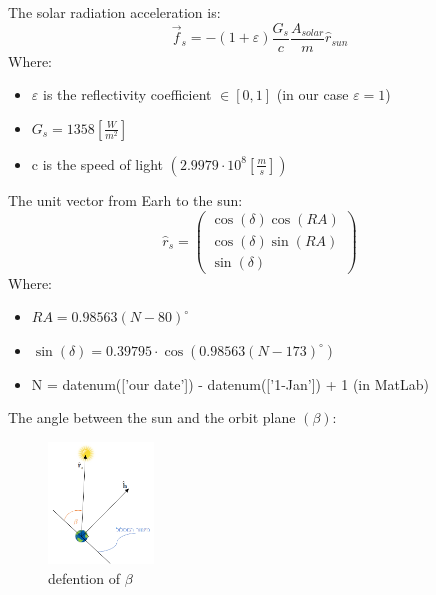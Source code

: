 \documentclass[11pt, a4paper]{article}
\begin{document}
\begin{itemize}
\begin{enumerate}
        The solar radiation acceleration is:
        \begin{equation}
            \vec{f}_s = -(1+\varepsilon)\frac{G_s}{c}\frac{A_{solar}}{m}\hat{r}_{sun}
        \end{equation}
        Where:
        \begin{itemize}
            \item $\varepsilon$ is the reflectivity coefficient $\in[0,1]$ (in our case $\varepsilon = 1$)
            \item $G_s = 1358 \left[\frac{W}{m^2}\right]$ 
            \item c is the speed of light $\left(2.9979\cdot10^8\left[\frac{m}{s}\right]\right)$
        \end{itemize}
        The unit vector from Earh to the sun:
        \begin{equation}
            \hat{r}_s = \begin{pmatrix}
                \cos(\delta)\cos(RA)\\
                \cos(\delta)\sin(RA)\\
                \sin(\delta)
            \end{pmatrix}
        \end{equation}
        Where:
        \begin{itemize}
            \item $RA = 0.98563(N-80)^\circ$
            \item $\sin(\delta) = 0.39795\cdot\cos\left(0.98563(N-173)^\circ\right)$
            \item N = datenum(['our date']) - datenum(['1-Jan']) + 1 (in MatLab)
        \end{itemize}
        The angle between the sun and the orbit plane $(\beta)$:
        \begin{figure}[H]
        \begin{center}
        \includegraphics[width=0.25\textwidth]{images/The angle between the sun and the orbit plane - beta.png}
        \caption{defention of $\beta$ \cite{SM_Tutorial_10}}
        \end{center}
        \end{figure}

\end{enumerate}
\end{itemize}
\end{document}
